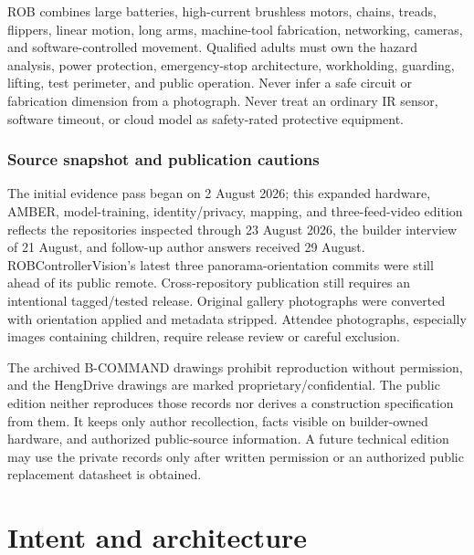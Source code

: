 \documentclass[10pt,openany]{book}
\begin{document}
\begin{safetybox}[title={NON-NEGOTIABLE SAFETY BOUNDARY}]
ROB combines large batteries, high-current brushless motors, chains, treads, flippers, linear motion, long arms, machine-tool fabrication, networking, cameras, and software-controlled movement. Qualified adults must own the hazard analysis, power protection, emergency-stop architecture, workholding, guarding, lifting, test perimeter, and public operation. Never infer a safe circuit or fabrication dimension from a photograph. Never treat an ordinary IR sensor, software timeout, or cloud model as safety-rated protective equipment.
\end{safetybox}

\ROBArduinoStatus
\ROBAmberStatus
\ROBSourceRoot

\section*{Source snapshot and publication cautions}

The initial evidence pass began on 2 August 2026; this expanded hardware, AMBER, model-training, identity/privacy, mapping, and three-feed-video edition reflects the repositories inspected through 23 August 2026, the builder interview of 21 August, and follow-up author answers received 29 August. ROBControllerVision's latest three panorama-orientation commits were still ahead of its public remote. Cross-repository publication still requires an intentional tagged/tested release. Original gallery photographs were converted with orientation applied and metadata stripped. Attendee photographs, especially images containing children, require release review or careful exclusion.

The archived B-COMMAND drawings prohibit reproduction without permission, and the HengDrive drawings are marked proprietary/confidential. The public edition neither reproduces those records nor derives a construction specification from them. It keeps only author recollection, facts visible on builder-owned hardware, and authorized public-source information. A future technical edition may use the private records only after written permission or an authorized public replacement datasheet is obtained.

\tableofcontents
\clearpage
\mainmatter

\part{Intent and architecture}
\end{document}
